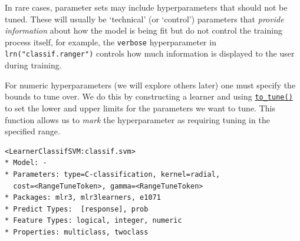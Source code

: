\begin{tcolorbox}[enhanced jigsaw, opacitybacktitle=0.6, rightrule=.15mm, opacityback=0, arc=.35mm, breakable, titlerule=0mm, colframe=quarto-callout-tip-color-frame, coltitle=black, bottomrule=.15mm, toprule=.15mm, colback=white, colbacktitle=quarto-callout-tip-color!10!white, bottomtitle=1mm, toptitle=1mm, title=\textcolor{quarto-callout-tip-color}{\faLightbulb}\hspace{0.5em}{Untunable Hyperparameters}, leftrule=.75mm, left=2mm]

In rare cases, parameter sets may include hyperparameters that should
not be tuned. These will usually be `technical' (or `control')
parameters that \emph{provide information} about how the model is being
fit but do not control the training process itself, for example, the
\texttt{verbose} hyperparameter in \texttt{lrn("classif.ranger")}
controls how much information is displayed to the user during training.

\end{tcolorbox}

For numeric hyperparameters (we will explore others later) one must
specify the bounds to tune over. We do this by constructing a learner
and using
\href{https://paradox.mlr-org.com/reference/to_tune.html}{\texttt{to\_tune()}}
to set the lower and upper limits for the parameters we want to tune.
This function allows us to \emph{mark} the hyperparameter as requiring
tuning in the specified range.

\begin{Shaded}
\begin{Highlighting}[]
\OtherTok{=} \NormalTok{(}\NormalTok{,}
   \NormalTok{,}
   \NormalTok{,}
   \NormalTok{(}\NormalTok{, }\NormalTok{),}
   \NormalTok{(}\NormalTok{, }\NormalTok{)}
\NormalTok{)}
\end{Highlighting}
\end{Shaded}

\begin{verbatim}
<LearnerClassifSVM:classif.svm>
* Model: -
* Parameters: type=C-classification, kernel=radial,
  cost=<RangeTuneToken>, gamma=<RangeTuneToken>
* Packages: mlr3, mlr3learners, e1071
* Predict Types:  [response], prob
* Feature Types: logical, integer, numeric
* Properties: multiclass, twoclass
\end{verbatim}

